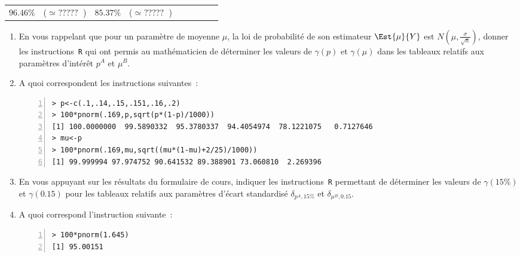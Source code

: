 \documentclass[10pt]{report}
\begin{document}
\begin{exercice}
\begin{center}
\begin{tabular}{|c|rl|rl|rl|rl|}
        $96.46\%$
         & 
    
        ($\simeq \mbox{ ????? }$)
         & 
    
        $85.37\%$
         & 
    
        ($\simeq \mbox{ ????? }$)
        
    \\ \cline{1-9}

    \end{tabular}

\end{center}

\begin{enumerate}
\item En vous rappelant que pour un paramètre de moyenne $\mu$, la loi de probabilité de son estimateur $\Est{\mu}{Y}$ est $N(\mu,\frac{\sigma}{\sqrt{n}})$, donner les instructions~\texttt{R} qui ont permis au mathématicien de déterminer les valeurs de $\gamma(p)$ et $\gamma(\mu)$ dans les tableaux relatifs aux paramètres d'intérêt $p^A$ et $\mu^B$.
\item A quoi correspondent les instructions suivantes~:
\begin{Verbatim}[frame=leftline,fontfamily=tt,fontshape=n,numbers=left]
> p<-c(.1,.14,.15,.151,.16,.2)
> 100*pnorm(.169,p,sqrt(p*(1-p)/1000))
[1] 100.0000000  99.5890332  95.3780337  94.4054974  78.1221075   0.7127646
> mu<-p
> 100*pnorm(.169,mu,sqrt((mu*(1-mu)+2/25)/1000))
[1] 99.999994 97.974752 90.641532 89.388901 73.060810  2.269396
\end{Verbatim}

\item En vous appuyant sur les résultats du formulaire de cours, indiquer les instructions~\texttt{R} permettant de déterminer les valeurs de $\gamma(15\%)$ et $\gamma(0.15)$ pour les tableaux relatifs aux paramètres d'écart standardisé $\delta_{p^A,15\%}$ et $\delta_{\mu^B,0.15}$.
\item A quoi correspond l'instruction suivante~:
\begin{Verbatim}[frame=leftline,fontfamily=tt,fontshape=n,numbers=left]
> 100*pnorm(1.645)
[1] 95.00151
\end{Verbatim}

\end{enumerate}
\end{exercice}
\end{document}
